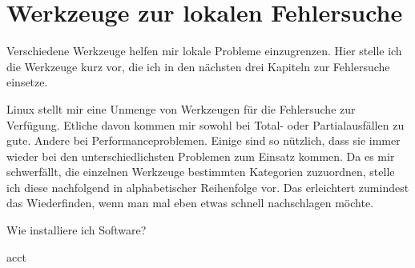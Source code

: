 \chapter{Werkzeuge zur lokalen Fehlersuche}
\label{cha:lokal-werkzeuge}

\begin{abstractsec}
  Verschiedene Werkzeuge helfen mir lokale Probleme einzugrenzen. Hier stelle
  ich die Werkzeuge kurz vor, die ich in den nächsten drei Kapiteln zur
  Fehlersuche einsetze.
\end{abstractsec}

\begin{normaltext}
  Linux stellt mir eine Unmenge von Werkzeugen für die Fehlersuche zur
  Verfügung. Etliche davon kommen mir sowohl bei Total- oder Partialausfällen
  zu gute. Andere bei Performanceproblemen. Einige sind so nützlich, dass sie
  immer wieder bei den unterschiedlichsten Problemen zum Einsatz kommen. Da
  es mir schwerfällt, die einzelnen Werkzeuge bestimmten Kategorien
  zuzuordnen, stelle ich diese nachfolgend in alphabetischer Reihenfolge vor.
  Das erleichtert zumindest das Wiederfinden, wenn man mal eben etwas schnell
  nachschlagen möchte.
\end{normaltext}

\begin{notes}
\item Wie installiere ich Software?
\item acct
\end{notes}

